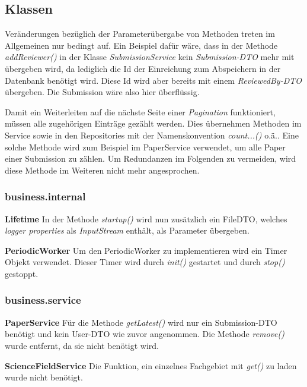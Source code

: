 \subsection{Klassen}

Veränderungen bezüglich der Parameterübergabe von Methoden treten im Allgemeinen nur bedingt auf. Ein Beispiel dafür wäre, dass in der Methode \emph{addReviewer()} in der Klasse \emph{SubmissionService} kein \emph{Submission-DTO} mehr mit übergeben wird, da lediglich die Id der Einreichung zum Abspeichern in der Datenbank benötigt wird. Diese Id wird aber bereits mit einem \emph{ReviewedBy-DTO} übergeben. Die Submission wäre also hier überflüssig.

Damit ein Weiterleiten auf die nächste Seite einer \emph{Pagination} funktioniert, müssen alle zugehörigen Einträge gezählt werden. Dies übernehmen Methoden im Service sowie in den Repositories mit der Namenskonvention \emph{count...()} o.ä.. Eine solche Methode wird zum Beispiel im PaperService verwendet, um alle Paper einer Submission zu zählen. Um Redundanzen im Folgenden zu vermeiden, wird diese Methode im Weiteren nicht mehr angesprochen.

\subsubsection{business.internal}

\textbf{Lifetime} In der Methode \emph{startup()} wird nun zusätzlich ein FileDTO, welches \emph{logger properties} als \emph{InputStream} enthält, als Parameter übergeben.

\textbf{PeriodicWorker} Um den PeriodicWorker zu implementieren wird ein Timer Objekt verwendet. Dieser Timer wird durch \emph{init()} gestartet und durch \emph{stop()} gestoppt.

\subsubsection{business.service}

\textbf{PaperService} Für die Methode \emph{getLatest()} wird nur ein Submission-DTO benötigt und kein User-DTO wie zuvor angenommen. \newline
Die Methode \emph{remove()} wurde entfernt, da sie nicht benötigt wird.

\textbf{ScienceFieldService} Die Funktion, ein einzelnes Fachgebiet mit \emph{get()} zu laden wurde nicht benötigt.

